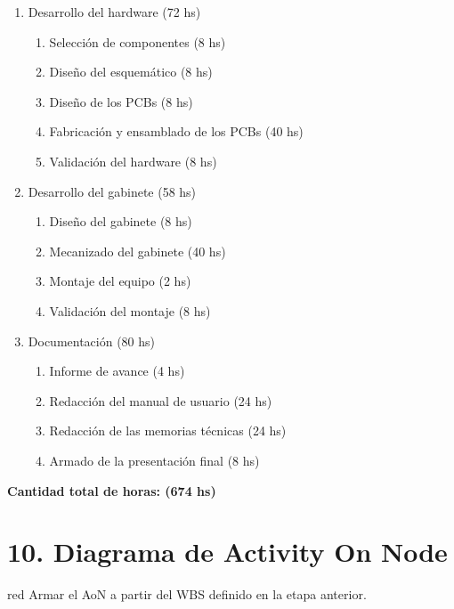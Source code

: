 \documentclass[
11pt, %
]{charter}
\begin{document}
\begin{enumerate}
	\item Desarrollo del hardware (72 hs)
	\begin{enumerate}
		\item Selección de componentes (8 hs)
		\item Diseño del esquemático (8 hs)
		\item Diseño de los PCBs (8 hs)
		\item Fabricación y ensamblado de los PCBs (40 hs)
		\item Validación del hardware (8 hs)
	\end{enumerate}

	\item Desarrollo del gabinete (58 hs)
	\begin{enumerate}
		\item Diseño del gabinete (8 hs)
		\item Mecanizado del gabinete (40 hs)
		\item Montaje del equipo (2 hs)
		\item Validación del montaje (8 hs)
	\end{enumerate}
	
	\item Documentación (80 hs)
	\begin{enumerate}
		\item Informe de avance (4 hs)
		\item Redacción del manual de usuario (24 hs)
		\item Redacción de las memorias técnicas (24 hs)
		\item Armado de la presentación final (8 hs)
	\end{enumerate}
\end{enumerate}

\textbf{Cantidad total de horas: (674 hs)}

\section{10. Diagrama de Activity On Node}
\label{sec:AoN}

\begin{consigna}{red}
Armar el AoN a partir del WBS definido en la etapa anterior. 



\end{consigna}
\end{document}
